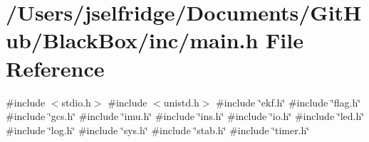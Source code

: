 \section{/\+Users/jselfridge/\+Documents/\+Git\+Hub/\+Black\+Box/inc/main.h File Reference}
\label{main_8h}
{\ttfamily \#include $<$stdio.\+h$>$}\newline
{\ttfamily \#include $<$unistd.\+h$>$}\newline
{\ttfamily \#include \char`\"{}ekf.\+h\char`\"{}}\newline
{\ttfamily \#include \char`\"{}flag.\+h\char`\"{}}\newline
{\ttfamily \#include \char`\"{}gcs.\+h\char`\"{}}\newline
{\ttfamily \#include \char`\"{}imu.\+h\char`\"{}}\newline
{\ttfamily \#include \char`\"{}ins.\+h\char`\"{}}\newline
{\ttfamily \#include \char`\"{}io.\+h\char`\"{}}\newline
{\ttfamily \#include \char`\"{}led.\+h\char`\"{}}\newline
{\ttfamily \#include \char`\"{}log.\+h\char`\"{}}\newline
{\ttfamily \#include \char`\"{}sys.\+h\char`\"{}}\newline
{\ttfamily \#include \char`\"{}stab.\+h\char`\"{}}\newline
{\ttfamily \#include \char`\"{}timer.\+h\char`\"{}}\newline
